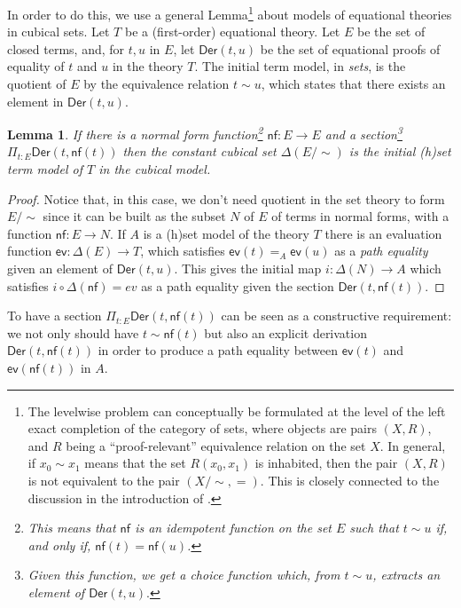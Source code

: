 \documentclass[10pt,a4paper]{article}
\newtheorem{lemma}[theorem]{Lemma}
\theoremstyle{definition}
\theoremstyle{remark}
\newcommand{\Der}{\mathsf{Der}}
\newcommand{\ev}{\mathsf{ev}}
\newcommand{\nf}{\mathsf{nf}}
\begin{document}
In order to do this, we use a general Lemma\footnote{The levelwise problem can conceptually be formulated at the level of the left exact
completion of the category of sets, where objects are pairs $(X,R)$, and $R$ being a ``proof-relevant'' equivalence relation on the set $X$.
In general, if $x_0\sim x_1$ means that the set $R(x_0,x_1)$ is inhabited, then the pair $(X,R)$ is not equivalent to the pair $(X/\sim,=)$.
This is closely connected to the discussion in the introduction of \cite{shulman21}.}
about models of equational theories in cubical sets. Let $T$
be a (first-order) equational theory. Let $E$ be the set of closed terms, and, for $t,u$ in $E$, let $\Der(t,u)$ be the set
of equational proofs of equality of $t$ and $u$ in the theory $T$. The initial term model, in {\em sets}, is the quotient of $E$
by the equivalence relation $t\sim u$, which states that there exists an element in $\Der(t,u)$.


\begin{lemma}\label{norm}
  If there is a normal form function\footnote{This means that $\nf$ is an idempotent function on the set $E$ such that
  $t\sim u$ if, and only if, $\nf(t) = \nf(u)$.} $\nf:E\rightarrow E$ and a section\footnote{Given this function, we get a choice
  function which, from $t\sim u$, extracts an element of $\Der(t,u).$} $\Pi_{t:E}\Der(t,\nf(t))$ then the constant cubical
  set $\Delta(E/\sim)$ is the initial (h)set term model of $T$ in the cubical model.
\end{lemma}

\begin{proof}
Notice that, in this case, we don't need quotient
in the set theory to form $E/\sim$ since it can be built as the subset $N$ of $E$ of terms in normal forms, with a function
$\nf:E\rightarrow N$. If $A$ is a (h)set model of the theory $T$ there is an evaluation function $\ev:\Delta(E)\rightarrow T$, which
satisfies $\ev(t) =_A \ev(u)$ as a {\em path equality} given an element of $\Der(t,u)$.
This gives the initial map $i:\Delta(N)\rightarrow A$ which satisfies $i\circ \Delta(\nf) = ev$ as a path equality given the section
$\Der(t,\nf(t))$.
\end{proof}

To have a section $\Pi_{t:E}\Der(t,\nf(t))$ can be seen as a constructive requirement: we not only should have $t\sim \nf(t)$ but also
an explicit derivation $\Der(t,\nf(t))$ in order to produce a path equality between $\ev(t)$ and $\ev(\nf(t))$ in $A$.
\end{document}
